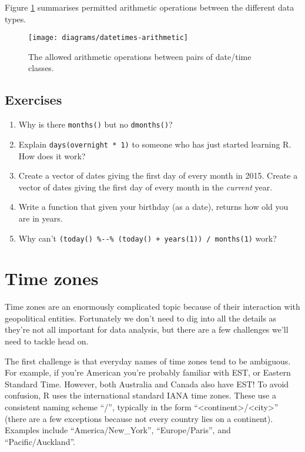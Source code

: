\documentclass[]{book}
\begin{document}
Figure \ref{fig:dt-algebra} summarises permitted arithmetic operations
between the different data types.

\begin{figure}

{\centering \texttt{[image: diagrams/datetimes-arithmetic]} 

}

\caption{The allowed arithmetic operations between pairs of date/time classes.}\label{fig:dt-algebra}
\end{figure}

\subsection{Exercises}\label{exercises-47}

\begin{enumerate}
\def\labelenumi{\arabic{enumi}.}
\item
  Why is there \texttt{months()} but no \texttt{dmonths()}?
\item
  Explain \texttt{days(overnight\ *\ 1)} to someone who has just started
  learning R. How does it work?
\item
  Create a vector of dates giving the first day of every month in 2015.
  Create a vector of dates giving the first day of every month in the
  \emph{current} year.
\item
  Write a function that given your birthday (as a date), returns how old
  you are in years.
\item
  Why can't
  \texttt{(today()\ \%-\/-\%\ (today()\ +\ years(1))\ /\ months(1)}
  work?
\end{enumerate}

\hypertarget{time-zones}{\section{Time zones}\label{time-zones}}

Time zones are an enormously complicated topic because of their
interaction with geopolitical entities. Fortunately we don't need to dig
into all the details as they're not all important for data analysis, but
there are a few challenges we'll need to tackle head on.

The first challenge is that everyday names of time zones tend to be
ambiguous. For example, if you're American you're probably familiar with
EST, or Eastern Standard Time. However, both Australia and Canada also
have EST! To avoid confusion, R uses the international standard IANA
time zones. These use a consistent naming scheme ``/'', typically in the
form
``\textless{}continent\textgreater{}/\textless{}city\textgreater{}''
(there are a few exceptions because not every country lies on a
continent). Examples include ``America/New\_York'', ``Europe/Paris'',
and ``Pacific/Auckland''.
\end{document}
